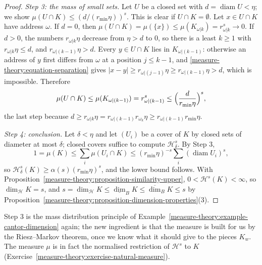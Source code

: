 \begin{proof}
\emph{Step 3: the mass of small sets.} Let $U$ be a closed set with $d = \operatorname{diam}U < \eta$; we show $\mu(U \cap K) \leq (d/(r_{\min}\eta))^s$. This is clear if $U \cap K = \emptyset$. Let
$x \in U \cap K$ have address $\omega$. If $d = 0$, then $\mu(U \cap K) = \mu(\{x\}) \leq \mu(K_{\omega|k}) = r_{\omega|k}^s \to 0$. If $d > 0$, the numbers $r_{\omega|k}\eta$ decrease from $\eta > d$ to $0$,
so there is a least $k \geq 1$ with $r_{\omega|k}\eta \leq d$, and $r_{\omega|(k - 1)}\eta > d$. Every $y \in U \cap K$ lies in $K_{\omega|(k - 1)}$: otherwise an address of $y$ first differs from
$\omega$ at a position $j \leq k - 1$, and \eqref{measure-theory:equation-separation} gives $|x - y| \geq r_{\omega|(j - 1)}\eta \geq r_{\omega|(k - 1)}\eta > d$, which is impossible. Therefore
\[
\mu(U \cap K) \leq \mu(K_{\omega|(k - 1)}) = r_{\omega|(k - 1)}^s \leq \Bigl(\frac{d}{r_{\min}\eta}\Bigr)^s,
\]
the last step because $d \geq r_{\omega|k}\eta = r_{\omega|(k - 1)}r_{\omega_k}\eta \geq r_{\omega|(k - 1)}r_{\min}\eta$.

\emph{Step 4: conclusion.} Let $\delta < \eta$ and let $(U_i)$ be a cover of $K$ by closed sets of diameter at most $\delta$; closed covers suffice to compute $\mathcal{H}^s_\delta$. By Step 3,
\[
1 = \mu(K) \leq \sum_i\mu(U_i \cap K) \leq (r_{\min}\eta)^{-s}\sum_i(\operatorname{diam}U_i)^s,
\]
so $\mathcal{H}^s_\delta(K) \geq \alpha(s)(r_{\min}\eta)^s$, and the lower bound follows. With Proposition~\ref{measure-theory:proposition-similarity-upper}, $0 < \mathcal{H}^s(K) < \infty$, so
$\dim_{\mathcal{H}}K = s$, and $s = \dim_{\mathcal{H}}K \leq \underline{\dim}_BK \leq \overline{\dim}_BK \leq s$ by Proposition~\ref{measure-theory:proposition-dimension-properties}(3).
\end{proof}

Step 3 is the mass distribution principle of Example~\ref{measure-theory:example-cantor-dimension} again; the new ingredient is that the measure is built for us by the Riesz--Markov theorem, once we
know what it should give to the pieces $K_w$. The measure $\mu$ is in fact the normalised restriction of $\mathcal{H}^s$ to $K$ (Exercise~\ref{measure-theory:exercise-natural-measure}).


